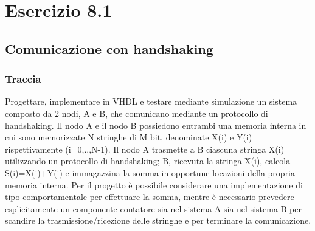 \chapter{Esercizio 8.1}
\section{Comunicazione con handshaking}
\subsection{Traccia}
 Progettare, implementare in VHDL e testare mediante simulazione un sistema composto da 2 nodi, A e B, che comunicano mediante un protocollo di handshaking. 
Il nodo A e il nodo B possiedono entrambi una memoria interna in cui sono memorizzate N stringhe di M bit, denominate X(i) e Y(i) rispettivamente (i=0,..,N-1). 
Il nodo A trasmette a B ciascuna stringa X(i) utilizzando un protocollo di handshaking; B, ricevuta la stringa X(i), calcola S(i)=X(i)+Y(i) e immagazzina la 
somma in opportune locazioni della propria memoria interna.
 Per il progetto è possibile considerare una implementazione di tipo comportamentale per effettuare la somma, mentre è necessario prevedere esplicitamente un componente contatore sia nel sistema A sia nel sistema B per scandire la trasmissione/ricezione delle stringhe e per terminare la comunicazione.

